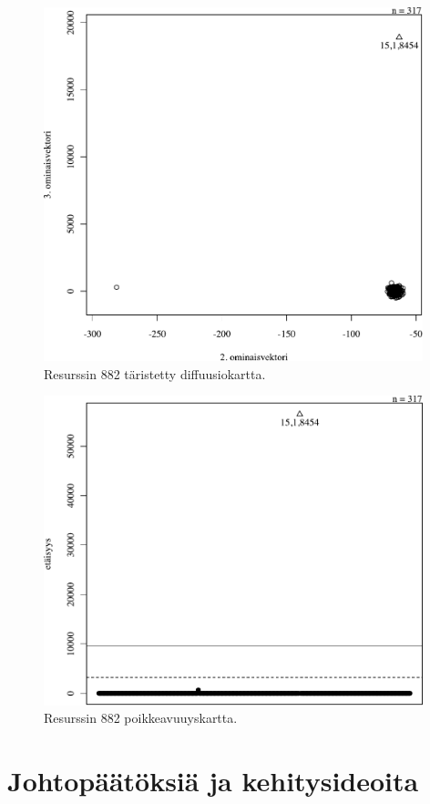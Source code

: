 \begin{figure}[p]
\centering
\includegraphics[width=11cm]{pics/diffuusiokuvat/service_882.pdf}
\caption{Resurssin 882 täristetty diffuusiokartta.}
\label{diffuusio_882}
\end{figure}

\begin{figure}[p]
\centering
\includegraphics[width=11cm]{pics/tiheyskuvat/service_882.pdf}
\caption{Resurssin 882 poikkeavuuyskartta.}
\label{service_882}
\end{figure}

\pagebreak

\section{Johtopäätöksiä ja kehitysideoita}

